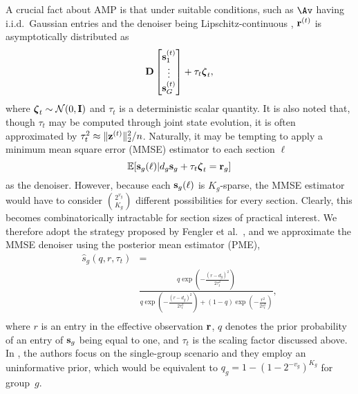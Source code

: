 \documentclass[journal]{IEEEtran}
\begin{document}
A crucial fact about AMP is that under suitable conditions, such as $\Av$ having i.i.d.\ Gaussian entries and the denoiser being Lipschitz-continuous \cite{bayati2011dynamics,berthier2020state}, $\mathbf{r}^{(t)}$ is asymptotically distributed as
\begin{equation}
    \label{eq:asymptoticeffectiveobservation}
    \mathbf{D} \begin{bmatrix} \mathbf{s}_1^{(t)} \\ \vdots \\ \mathbf{s}_G^{(t)} \\ \end{bmatrix}
     + \tau_t \boldsymbol{\zeta}_t,
\end{equation}
where $\boldsymbol{\zeta}_t \sim \mathcal{N}(0, \mathbf{I})$ and $\tau_t$ is a deterministic scalar quantity.
It is also noted that, though $\tau_t$ may be computed through joint state evolution, it is often approximated by $\tau_t^2 \approx \| \mathbf{z}^{(t)} \|_2^2 / n$. 
Naturally, it may be tempting to apply a minimum mean square error (MMSE) estimator to each section $\ell$
\begin{equation*}
    \mathbb{E}[\mathbf{s}_g(\ell) | d_g\mathbf{s}_g + \tau_t\boldsymbol{\zeta}_t = \mathbf{r}_g]    
\end{equation*}
as the denoiser.
However, because each $\mathbf{s}_g(\ell)$ is $K_g$-sparse, the MMSE estimator would have to consider $\binom{2^{v_g}}{K_g}$ different possibilities for every section.
Clearly, this becomes combinatorically intractable for section sizes of practical interest.
We therefore adopt the strategy proposed by Fengler et al.~\cite{fengler2019sparcs},  and we approximate the MMSE denoiser using the posterior mean estimator (PME),
\begin{equation} \label{eq:OriginalPME}
    \begin{split}
        \hat{s}_{g} \left( q, r, \tau_t \right) &=     \\
        &\frac{q \exp \left( - \frac{ \left( r - d_{g} \right)^2}{2 \tau_t^2} \right)}
        { q \exp \left( - \frac{ \left( r -  d_{g} \right)^2}{2 \tau_t^2} \right)
        + (1-q) \exp \left( -\frac{r^2}{2 \tau_t^2} \right)}, \\
    \end{split}
\end{equation}
where $r$ is an entry in the effective observation $\mathbf{r}$, $q$ denotes the prior probability of an entry of $\mathbf{s}_{g}$ being equal to one, and $\tau_t$ is the scaling factor discussed above.
In \cite{fengler2019sparcs}, the authors focus on the single-group scenario and they employ an uninformative prior, which would be equivalent to $q_g = 1 - (1 - 2^{-v_g})^{K_g}$ for group~$g$.
\end{document}
